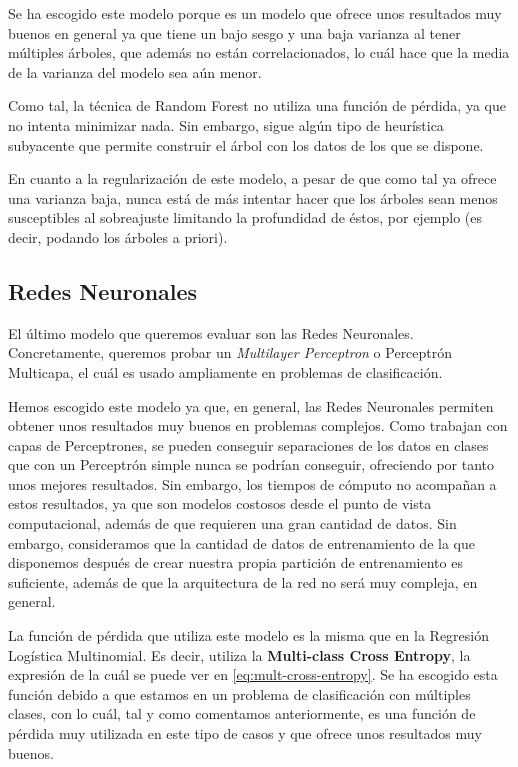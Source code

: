 \documentclass[11pt,a4paper]{article}
\begin{document}
Se ha escogido este modelo porque es un modelo que ofrece unos resultados muy buenos en general ya que tiene un bajo sesgo y una baja varianza
al tener múltiples árboles, que además no están correlacionados, lo cuál hace que la media de la varianza del modelo sea aún menor.

Como tal, la técnica de Random Forest no utiliza una función de pérdida, ya que no intenta minimizar nada. Sin embargo, sigue algún tipo de
heurística subyacente que permite construir el árbol con los datos de los que se dispone.

En cuanto a la regularización de este modelo, a pesar de que como tal ya ofrece una varianza baja, nunca está de más intentar hacer que
los árboles sean menos susceptibles al sobreajuste limitando la profundidad de éstos, por ejemplo (es decir, podando los árboles a priori).

\subsection{Redes Neuronales}

El último modelo que queremos evaluar son las Redes Neuronales. Concretamente, queremos probar un \textit{Multilayer Perceptron} o Perceptrón
Multicapa, el cuál es usado ampliamente en problemas de clasificación.

Hemos escogido este modelo ya que, en general, las Redes Neuronales permiten obtener unos resultados muy buenos en problemas complejos.
Como trabajan con capas de Perceptrones, se pueden conseguir separaciones de los datos en clases que con un Perceptrón simple nunca se
podrían conseguir, ofreciendo por tanto unos mejores resultados. Sin embargo, los tiempos de cómputo no acompañan a estos resultados, ya que
son modelos costosos desde el punto de vista computacional, además de que requieren una gran cantidad de datos. Sin embargo, consideramos que
la cantidad de datos de entrenamiento de la que disponemos después de crear nuestra propia partición de entrenamiento es suficiente, además
de que la arquitectura de la red no será muy compleja, en general.

La función de pérdida que utiliza este modelo es la misma que en la Regresión Logística Multinomial. Es decir, utiliza la \textbf{Multi-class
Cross Entropy}, la expresión de la cuál se puede ver en \eqref{eq:mult-cross-entropy}. Se ha escogido esta función debido a que estamos
en un problema de clasificación con múltiples clases, con lo cuál, tal y como comentamos anteriormente, es una función de pérdida muy utilizada
en este tipo de casos y que ofrece unos resultados muy buenos.
\end{document}
